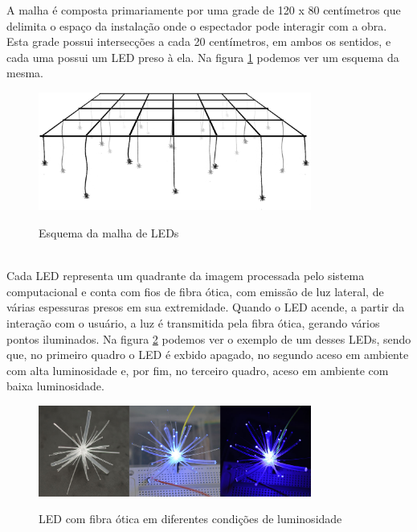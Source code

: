 A malha é composta primariamente por uma grade de 120 x 80 centímetros que delimita o espaço da instalação onde o espectador pode interagir com a obra. Esta grade possui intersecções a cada 20 centímetros, em ambos os sentidos, e cada uma possui um LED preso à ela. Na figura \ref{fig:malha} podemos ver um esquema da mesma.

\begin{figure}[H]
    \centering
    \caption{Esquema da malha de LEDs}
	\vspace*{0,2cm}
    \includegraphics[width=0.8\textwidth]{./04-figuras/malha}
    \label{fig:malha}
\end{figure}
\vspace*{-0,9cm}
{\raggedright {}}\\

Cada LED representa um quadrante da imagem processada pelo sistema computacional e conta com fios de fibra ótica, com emissão de luz lateral, de várias espessuras presos em sua extremidade. Quando o LED acende, a partir da interação com o usuário, a luz é transmitida pela fibra ótica, gerando vários pontos iluminados. Na figura \ref{fig:led_fibra_otica} podemos ver o exemplo de um desses LEDs, sendo que, no primeiro quadro o LED é exbido apagado, no segundo aceso em ambiente com alta luminosidade e, por fim, no terceiro quadro, aceso em ambiente com baixa luminosidade. 

\begin{figure}[H]
    \centering
    \caption{LED com fibra ótica em diferentes condições de luminosidade}
	\vspace*{0,2cm}
    \includegraphics[width=0.8\textwidth]{./04-figuras/led_fibra_otica}
    \label{fig:led_fibra_otica}
\end{figure}
\vspace*{-0,9cm}
{\raggedright {}}\\


